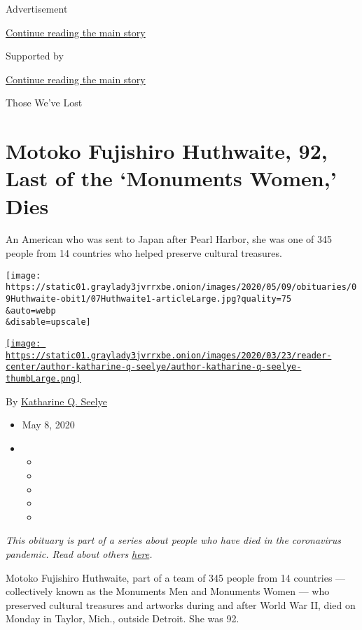 Advertisement

\protect\hyperlink{after-top}{Continue reading the main story}

Supported by

\protect\hyperlink{after-sponsor}{Continue reading the main story}

Those We've Lost

\hypertarget{motoko-fujishiro-huthwaite-92-last-of-the-monuments-women-dies}{%
\section{Motoko Fujishiro Huthwaite, 92, Last of the `Monuments Women,'
Dies}\label{motoko-fujishiro-huthwaite-92-last-of-the-monuments-women-dies}}

An American who was sent to Japan after Pearl Harbor, she was one of 345
people from 14 countries who helped preserve cultural treasures.

\texttt{[image: https://static01.graylady3jvrrxbe.onion/images/2020/05/09/obituaries/09Huthwaite-obit1/07Huthwaite1-articleLarge.jpg?quality=75\\\&auto=webp\\\&disable=upscale]}

\href{https://www.nytimes3xbfgragh.onion/by/katharine-q-seelye}{\texttt{[image: https://static01.graylady3jvrrxbe.onion/images/2020/03/23/reader-center/author-katharine-q-seelye/author-katharine-q-seelye-thumbLarge.png]}}

By
\href{https://www.nytimes3xbfgragh.onion/by/katharine-q-seelye}{Katharine
Q. Seelye}

\begin{itemize}
\item
  May 8, 2020
\item
  \begin{itemize}
  \item
  \item
  \item
  \item
  \item
  \end{itemize}
\end{itemize}

\emph{This obituary is part of a series about people who have died in
the coronavirus pandemic. Read about others}
\href{https://www.nytimes3xbfgragh.onion/series/people-who-have-died-of-the-coronavirus}{\emph{here}}\emph{.}

Motoko Fujishiro Huthwaite, part of a team of 345 people from 14
countries --- collectively known as the Monuments Men and Monuments
Women --- who preserved cultural treasures and artworks during and after
World War II, died on Monday in Taylor, Mich., outside Detroit. She was
92.

